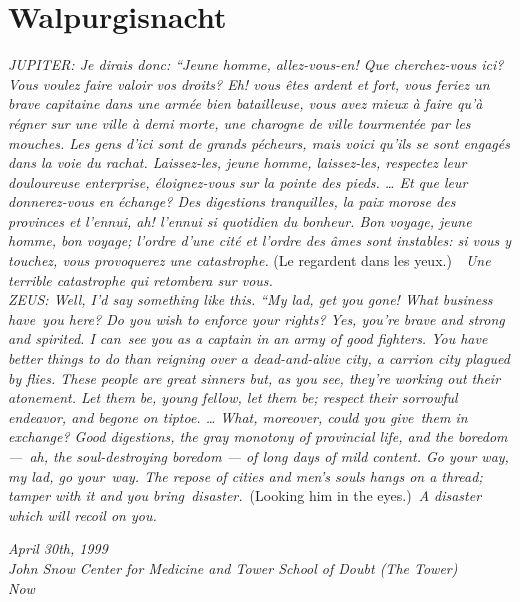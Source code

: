 \hypertarget{walpurgisnacht}{%
\chapter{Walpurgisnacht}\label{walpurgisnacht}}

\emph{JUPITER: Je dirais donc: ``Jeune homme, allez-vous-en! Que
cherchez-vous ici? Vous voulez faire valoir vos droits? Eh! vous êtes
ardent et fort, vous feriez un brave capitaine dans une armée bien
batailleuse, vous avez mieux à faire qu'à régner sur une ville à demi
morte, une charogne de ville tourmentée par les mouches. Les gens d'ici
sont de grands pécheurs, mais voici qu'ils se sont engagés dans la voie
du rachat. Laissez-les, jeune homme, laissez-les, respectez leur
douloureuse enterprise, éloignez-vous sur la pointe des pieds. \ldots{}
Et que leur donnerez-vous en échange? Des digestions tranquilles, la
paix morose des provinces et l'ennui, ah! l'ennui si quotidien du
bonheur. Bon voyage, jeune homme, bon voyage; l'ordre d'une cité et
l'ordre des âmes sont instables: si vous y touchez, vous provoquerez une
catastrophe.} (Le regardent dans les yeux.)~~\emph{Une terrible
catastrophe qui retombera sur vous.}\\

\emph{ZEUS: Well, I'd say something like this. ``My lad, get you gone!
What business have~you here? Do you wish to enforce your rights? Yes,
you're brave and strong and spirited. I can~see you as a captain in an
army of good fighters. You have better things to do than reigning over a
dead-and-alive city, a carrion city plagued by flies. These people are
great sinners but, as you see, they're working out their atonement. Let
them be, young fellow, let them be; respect their sorrowful endeavor,
and begone on tiptoe. \ldots{} What, moreover, could you give~them in
exchange? Good digestions, the gray monotony of provincial life, and the
boredom ---~ah, the soul-destroying boredom --- of long days of mild
content. Go your way, my lad, go your~way. The repose of cities and
men's souls hangs on a thread; tamper with it and you
bring~disaster.}~(Looking him in the eyes.)~\emph{A disaster which will
recoil on you.}


\mybreak

\emph{April 30th, 1999}\\
\emph{John Snow Center for Medicine and Tower School of Doubt (The
Tower)}\\
\emph{Now}\\

